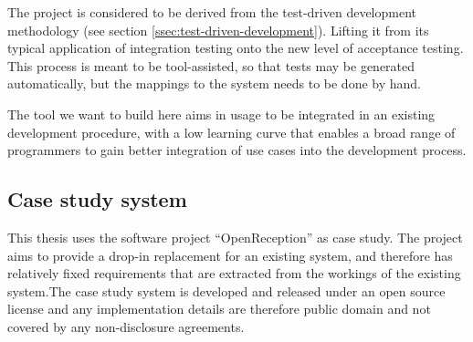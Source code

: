 \noindent The project is considered to be derived from the test-driven development methodology (see section \ref{ssec:test-driven-development}). Lifting it from its typical application of integration testing onto the new level of acceptance testing. This process is meant to be tool-assisted, so that tests may be generated automatically, but the mappings to the system needs to be done by hand.\medskip

\noindent The tool we want to build here aims in usage to be integrated in an existing development procedure, with a low learning curve that enables a broad range of programmers to gain better integration of use cases into the development process.

\subsection{Case study system}
This thesis uses the software project ``OpenReception'' as case study. The project aims to provide a drop-in replacement for an existing system, and therefore has relatively fixed requirements that are extracted from the workings of the existing system.The case study system is developed and released under an open source license and any implementation details are therefore public domain and not covered by any non-disclosure agreements.

